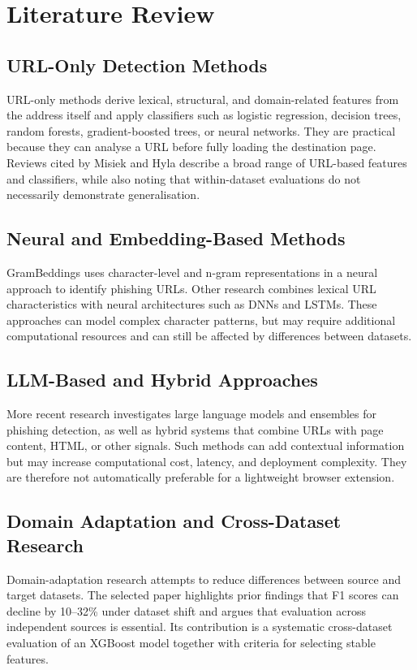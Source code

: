 \chapter{Literature Review}
\setcounter{equation}{0}
\section{URL-Only Detection Methods}
URL-only methods derive lexical, structural, and domain-related features from the address itself and apply classifiers such as logistic regression, decision trees, random forests, gradient-boosted trees, or neural networks. They are practical because they can analyse a URL before fully loading the destination page. Reviews cited by Misiek and Hyla describe a broad range of URL-based features and classifiers, while also noting that within-dataset evaluations do not necessarily demonstrate generalisation.\cite{bib1}

\section{Neural and Embedding-Based Methods}
GramBeddings uses character-level and n-gram representations in a neural approach to identify phishing URLs. Other research combines lexical URL characteristics with neural architectures such as DNNs and LSTMs. These approaches can model complex character patterns, but may require additional computational resources and can still be affected by differences between datasets.\cite{bib1}

\section{LLM-Based and Hybrid Approaches}
More recent research investigates large language models and ensembles for phishing detection, as well as hybrid systems that combine URLs with page content, HTML, or other signals. Such methods can add contextual information but may increase computational cost, latency, and deployment complexity. They are therefore not automatically preferable for a lightweight browser extension.\cite{bib1}

\section{Domain Adaptation and Cross-Dataset Research}
Domain-adaptation research attempts to reduce differences between source and target datasets. The selected paper highlights prior findings that F1 scores can decline by 10--32\% under dataset shift and argues that evaluation across independent sources is essential. Its contribution is a systematic cross-dataset evaluation of an XGBoost model together with criteria for selecting stable features.\cite{bib1}

